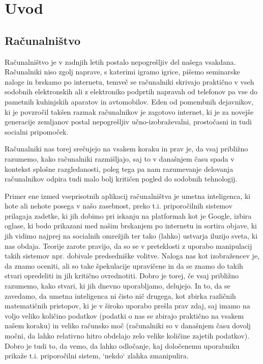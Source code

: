 \chapter{Uvod}

\section{Računalništvo}

Računalništvo je v zadnjih letih postalo nepogrešljiv del našega vsakdana. Računalniki niso zgolj naprave, s katerimi igramo igrice, pišemo seminarske naloge in brskamo po internetu, temveč se računalniki skrivajo praktično v vseh sodobnih elektronskih ali z elektroniko podprtih napravah od telefonov pa vse do pametnih kuhinjskih aparatov in avtomobilov. Eden od pomembnih dejavnikov, ki je povzročil takšen razmak računalnikov je zagotovo internet, ki je za novejše generacije zemljanov postal nepogrešljiv učno-izobraževalni, prostočasni in tudi socialni pripomoček. 

Računalniki nas torej srečujejo na vsakem koraku in prav je, da vsaj približno razumemo, kako računalniki razmišljajo, saj to v današnjem času spada v kontekst splošne razgledanosti, poleg tega pa nam razumevanje delovanja računalnikov odpira tudi malo bolj kritičen pogled do sodobnih tehnologij. 

Primer ene izmed vseprisotnih aplikacij računalništva je umetna inteligenca, ki hote ali nehote posega v našo zasebnost, preko t.i. priporočilnih sistemov prilagaja zadetke, ki jih dobimo pri iskanju na platformah kot je Google, izbira oglase, ki bodo prikazani med našim brskanjem po internetu in sortira objave, ki jih vidimo najprej na socialnih omrežjih ter tako (lahko) ustvarja iluzijo sveta, ki nas obdaja. Teorije zarote pravijo, da so se v preteklosti z uporabo manipulacij takih sistemov npr. dobivale predsedniške volitve. Naloga nas kot izobražencev je, da znamo oceniti, ali so take špekulacije upravičene in da se znamo do takih stvari opredeliti in jih kritično ovrednotiti. Dobro je torej, če vsaj približno razumemo, kako stvari, ki jih dnevno uporabljamo, delujejo. In to, da se zavedamo, da umetna inteligenca ni čisto nič drugega, kot zbirka različnih matematičnih pristopov, ki je v široko uporabo prešla prav zdaj, saj imamo na voljo veliko količino podatkov (podatki o nas se zbirajo praktično na vsakem našem koraku) in veliko računsko moč (računalniki so v današnjem času dovolj močni, da lahko relativno hitro obdelajo zelo velike količine zajetih podatkov). Dobro je tudi to, da vemo, da lahko odločanje, kaj določenemu uporabniku prikaže t.i. priporočilni sistem, `nekdo` zlahka zmanipulira.  


